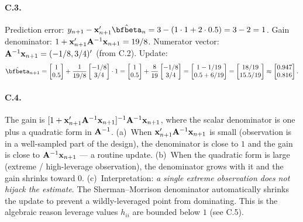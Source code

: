 \documentclass{article}
\begin{document}
\paragraph{C.3.}  Prediction error: $y_{n+1} - \bm x_{n+1}'\hat\bfbeta_n = 3 - (1\cdot 1 + 2\cdot 0.5) = 3 - 2 = 1$.  Gain denominator: $1 + \mathbf x_{n+1}'{\mathbf A}^{-1}\mathbf x_{n+1} = 19/8$.  Numerator vector: ${\mathbf A}^{-1}\mathbf x_{n+1} = (-1/8, 3/4)'$ (from C.2).  Update:
$$\hat\bfbeta_{n+1} = \begin{bmatrix}1\\ 0.5\end{bmatrix} + \frac{1}{19/8}\begin{bmatrix}-1/8\\ 3/4\end{bmatrix}\cdot 1 = \begin{bmatrix}1\\ 0.5\end{bmatrix} + \frac{8}{19}\begin{bmatrix}-1/8\\ 3/4\end{bmatrix} = \begin{bmatrix}1 - 1/19\\ 0.5 + 6/19\end{bmatrix} = \begin{bmatrix}18/19\\ 15.5/19\end{bmatrix} \approx \begin{bmatrix}0.947\\ 0.816\end{bmatrix}.$$

\paragraph{C.4.}  The gain is $[1 + \mathbf x_{n+1}'{\mathbf A}^{-1}\mathbf x_{n+1}]^{-1}{\mathbf A}^{-1}\mathbf x_{n+1}$, where the scalar denominator is one plus a quadratic form in ${\mathbf A}^{-1}$.  (a)~When $\mathbf x_{n+1}'{\mathbf A}^{-1}\mathbf x_{n+1}$ is small (observation is in a well-sampled part of the design), the denominator is close to $1$ and the gain is close to ${\mathbf A}^{-1}\mathbf x_{n+1}$ --- a routine update.  (b)~When the quadratic form is large (extreme / high-leverage observation), the denominator grows with it and the gain shrinks toward $0$.  (c)~Interpretation: \emph{a single extreme observation does not hijack the estimate}.  The Sherman--Morrison denominator automatically shrinks the update to prevent a wildly-leveraged point from dominating.  This is the algebraic reason leverage values $h_{ii}$ are bounded below $1$ (see C.5).
\end{document}
